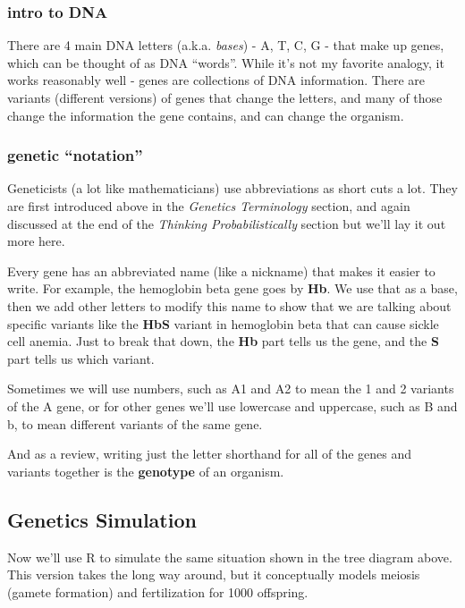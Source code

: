 \documentclass[]{book}
\theoremstyle{definition}
\theoremstyle{definition}
\theoremstyle{definition}
\theoremstyle{remark}
\begin{document}
\subsubsection{intro to DNA}\label{intro-to-dna}

There are 4 main DNA letters (a.k.a. \emph{bases}) - A, T, C, G - that
make up genes, which can be thought of as DNA ``words''. While it's not
my favorite analogy, it works reasonably well - genes are collections of
DNA information. There are variants (different versions) of genes that
change the letters, and many of those change the information the gene
contains, and can change the organism.

\subsubsection{\texorpdfstring{genetic
``notation''}{genetic notation}}\label{genetic-notation}

Geneticists (a lot like mathematicians) use abbreviations as short cuts
a lot. They are first introduced above in the \emph{Genetics
Terminology} section, and again discussed at the end of the
\emph{Thinking Probabilistically} section but we'll lay it out more
here.

Every gene has an abbreviated name (like a nickname) that makes it
easier to write. For example, the hemoglobin beta gene goes by
\textbf{Hb}. We use that as a base, then we add other letters to modify
this name to show that we are talking about specific variants like the
\textbf{HbS} variant in hemoglobin beta that can cause sickle cell
anemia. Just to break that down, the \textbf{Hb} part tells us the gene,
and the \textbf{S} part tells us which variant.

Sometimes we will use numbers, such as A1 and A2 to mean the 1 and 2
variants of the A gene, or for other genes we'll use lowercase and
uppercase, such as B and b, to mean different variants of the same gene.

And as a review, writing just the letter shorthand for all of the genes
and variants together is the \textbf{genotype} of an organism.

\subsection{Genetics Simulation}\label{genetics-simulation}

Now we'll use R to simulate the same situation shown in the tree diagram
above. This version takes the long way around, but it conceptually
models meiosis (gamete formation) and fertilization for 1000 offspring.
\end{document}

